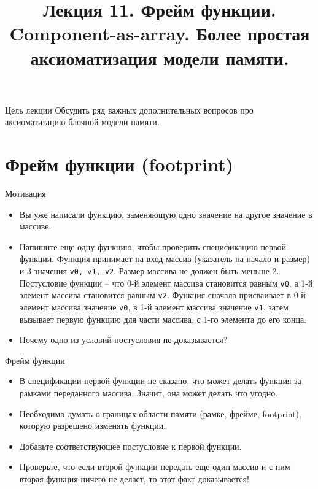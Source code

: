 \documentclass[hyperref={unicode=true}]{beamer}
\title{Лекция 11. Фрейм функции. Component-as-array.
    Более простая аксиоматизация модели памяти.}
\author{}
\date{}
\begin{document}
	\begin{frame}{}
		\titlepage
	\end{frame}

    \begin{frame}{Цель лекции}
    Обсудить ряд важных дополнительных вопросов
    про аксиоматизацию блочной модели памяти.
    \end{frame}

    \section{Фрейм функции (footprint)}

    \begin{frame}{Мотивация}
    \begin{itemize}
    \item
    Вы уже написали функцию, заменяющую
    одно значение на другое значение в массиве.
    \item
    Напишите еще одну функцию, чтобы проверить
    спецификацию первой функции. Функция принимает
    на вход массив (указатель на начало и размер)
    и 3 значения \texttt{v0, v1, v2}. Размер массива
    не должен быть меньше 2. Постусловие функции --
    что 0-й элемент массива становится равным
    \texttt{v0}, а 1-й элемент массива становится
    равным \texttt{v2}. Функция сначала присваивает
    в 0-й элемент массива значение \texttt{v0},
    в 1-й элемент массива значение \texttt{v1},
    затем вызывает первую функцию для части массива,
    с 1-го элемента до его конца.
    \item
    Почему одно из условий постусловия не доказывается?
    \end{itemize}
    \end{frame}

    \begin{frame}{Фрейм функции}
    \begin{itemize}
    \item
    В спецификации первой функции не сказано, что
    может делать функция за рамками переданного массива.
    Значит, она может делать что угодно.
    \item
    Необходимо думать о границах области памяти (рамке,
    фрейме, footprint), которую разрешено изменять функции.
    \item
    Добавьте соответствующее постусловие к первой функции.
    \item
    Проверьте, что если второй функции передать еще один массив
    и с ним вторая функция ничего не делает, то этот факт
    доказывается!
    \end{itemize}
    \end{frame}
\end{document}
